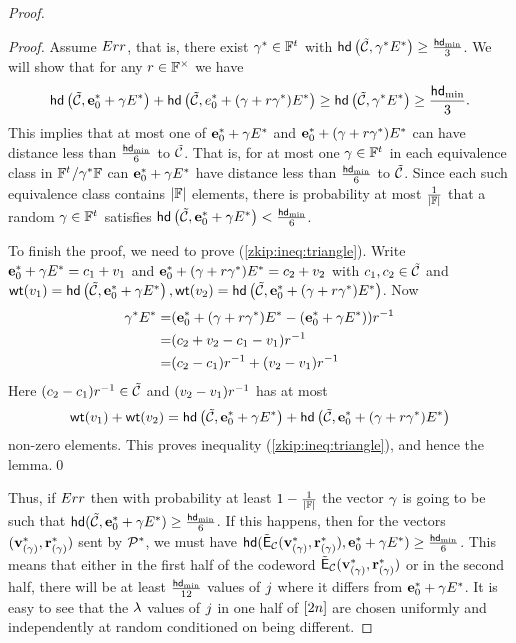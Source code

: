 \begin{proof}
\begin{proof}
Assume $Err$, that is, there exist ${\mathbf{\gamma}}^*\in \mathbb{F}^{{t_{}}}$ with $\mathsf{hd}\left(\tilde{\mathcal{C}}, {\mathbf{\gamma}}^* E^*\right)\geq \frac{\mathsf{hd}_{\mathrm{min}}}{3}$. We will show that for any $r\in \mathbb{F}^{\times}$ we have 
\begin{align}\mathsf{hd}\left(\tilde{\mathcal{C}},{\mathbf{e}^*_0}+{\mathbf{\gamma}} E^*\right)+\mathsf{hd}\left(\tilde{\mathcal{C}},e^*_0+({\mathbf{\gamma}}+r{\mathbf{\gamma}}^*)E^*\right)\geq \mathsf{hd}\left(\tilde{\mathcal{C}},{\mathbf{\gamma}}^* E^*\right)\geq \frac{\mathsf{hd}_{\mathrm{min}}}{3}.\label{zkip:ineq:triangle}
\end{align}
This implies that at most one of ${\mathbf{e}^*_0}+{\mathbf{\gamma}} E^*$ and $\mathbf{e}^*_0+({\mathbf{\gamma}}+r{\mathbf{\gamma}}^*) E^*$ can have distance less than $\frac{\mathsf{hd}_{\mathrm{min}}}{6}$ to $\tilde{\mathcal{C}}$. That is, for at most one ${\mathbf{\gamma}}\in \mathbb{F}^{{t_{}}}$ in each equivalence class in $\mathbb{F}^{t_{}}/ {\mathbf{\gamma}}^* \mathbb{F}$ can ${\mathbf{e}^*_0}+{\mathbf{\gamma}} E^*$ have distance less than $\frac{\mathsf{hd}_{\mathrm{min}}}{6}$ to $\tilde{\mathcal{C}}$. Since each such equivalence class contains $|\mathbb{F}|$ elements, there is probability at most $\frac{1}{|\mathbb{F}|}$ that a random ${\mathbf{\gamma}}\in\mathbb{F}^{{t_{}}}$ satisfies $\mathsf{hd}\left(\tilde{\mathcal{C}},{\mathbf{e}^*_0}+{\mathbf{\gamma}} E^*\right)<\frac{\mathsf{hd}_{\mathrm{min}}}{6}$. 

To finish the proof, we need to prove (\ref{zkip:ineq:triangle}). Write ${\mathbf{e}^*_0}+{\mathbf{\gamma}} E^*=c_1+v_1$ and $\mathbf{e}^*_0+({\mathbf{\gamma}}+r{\mathbf{\gamma}}^*) E^*=c_2+v_2$ with $c_1,c_2\in \tilde{\mathcal{C}}$ and $\mathsf{wt}(v_1)=\mathsf{hd}\left(\tilde{\mathcal{C}},{\mathbf{e}^*_0}+{\mathbf{\gamma}} E^*\right), \mathsf{wt}(v_2)=\mathsf{hd}\left(\tilde{\mathcal{C}},\mathbf{e}^*_0+({\mathbf{\gamma}}+r{\mathbf{\gamma}}^*) E^*\right)$. Now 
\begin{align*}{\mathbf{\gamma}}^* E^*=&(\mathbf{e}^*_0+({\mathbf{\gamma}}+r{\mathbf{\gamma}}^*) E^* - ({\mathbf{e}^*_0}+{\mathbf{\gamma}} E^*))r^{-1}\\
=&(c_2+v_2-c_1-v_1)r^{-1}\\
=& (c_2-c_1)r^{-1} + (v_2-v_1)r^{-1}
\end{align*}
Here $ (c_2-c_1)r^{-1}\in \tilde{\mathcal{C}}$ and $(v_2-v_1)r^{-1}$ has at most 
\[\mathsf{wt}(v_1)+\mathsf{wt}(v_2)=\mathsf{hd}\left(\tilde{\mathcal{C}},{\mathbf{e}^*_0}+{\mathbf{\gamma}} E^*\right)+\mathsf{hd}\left(\tilde{\mathcal{C}},\mathbf{e}^*_0+({\mathbf{\gamma}}+r{\mathbf{\gamma}}^*) E^* \right)\]
non-zero elements. This proves inequality (\ref{zkip:ineq:triangle}), and hence the lemma.\qed
\end{proof}

Thus, if $ Err$ then with probability at least $1-\frac{1}{|\mathbb{F}|}$ the vector ${\mathbf{\gamma}}$ is going to be such that $\mathsf{hd}(\tilde{\mathcal{C}},\mathbf{e}^*_0+\mathbf{\gamma} E^*)\geq \frac{\mathsf{hd}_{\mathrm{min}}}{6}$. If this happens, then for the vectors $({\mathbf{v}}_{({\mathbf{\gamma}})}^*,\mathbf{r}_{({\mathbf{\gamma}})}^*)$ sent by $\mathcal{P}^*$, we must have $\mathsf{hd}(\tilde{\mathsf{E}}_{\mathcal{C}}({\mathbf{v}}_{({\mathbf{\gamma}})}^*,\mathbf{r}_{({\mathbf{\gamma}})}^*),\mathbf{e}^*_0+{\mathbf{\gamma}} E^*)\geq \frac{\mathsf{hd}_{\mathrm{min}}}{6}$. This means that either in the first half of the codeword $\tilde{\mathsf{E}}_{\mathcal{C}}({\mathbf{v}}_{({\mathbf{\gamma}})}^*,\mathbf{r}_{({\mathbf{\gamma}})}^*)$ or in the second half, there will be at least $\frac{\mathsf{hd}_{\mathrm{min}}}{12}$ values of $j$ where it differs from $\mathbf{e}^*_0+{\mathbf{\gamma}} E^*$. It is easy to see that the $\lambda$ values of $j$ in one half of $[2n]$ are chosen uniformly and independently at random conditioned on being different.



\end{proof}
